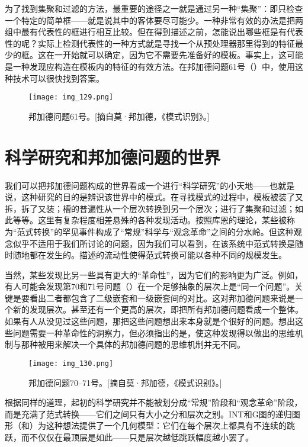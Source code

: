 为了找到集聚和过滤的方法，最重要的途径之一就是通过另一种“集聚”：即只检查一个特定的简单框——就是说其中的客体要尽可能少。一种非常有效的办法是把两组中最有代表性的框进行相互比较。但在得到描述之前，怎能说出哪些框是有代表性的呢？实际上检测代表性的一种方式就是寻找一个从预处理器那里得到的特征最少的框。这在一开始就可以确定，因为它不需要先准备好的模板。事实上，这可能是一种发现应构造在模板内的特征的有效方法。在邦加德问题61号（）中，使用这种技术可以很快找到答案。

\begin{figure}
\texttt{[image: img\_129.png]}
\caption[邦加德问题61号。]
  {邦加德问题61号。[摘自莫·邦加德，《模式识别》。]}
\end{figure}

\section{科学研究和邦加德问题的世界}

我们可以把邦加德问题构成的世界看成一个进行“科学研究”的小天地——也就是说，这种研究的目的是辨识该世界中的模式。在寻找模式的过程中，模板被装了又拆，拆了又装；槽的普遍性从一个层次转换到另一个层次；进行了集聚和过滤；如此等等。这里有复杂程度相差悬殊的各种发现活动。按照库恩的理论，某些被称为“范式转换”的罕见事件构成了“常规”科学与“观念革命”之间的分水岭。但这种观念似乎不适用于我们所讨论的问题，因为我们可以看到，在该系统中范式转换是随时随地都在发生的。描述的流动性使得范式转换可能以各种不同的规模发生。

当然，某些发现比另一些具有更大的“革命性”，因为它们的影响更为广泛。例如，有人可能会发现第70和71号问题（）在一个足够抽象的层次上是“同一个问题”。关键是要看出二者都包含了二级嵌套和一级嵌套间的对比。这对邦加德问题来说是一个新的发现层次。甚至还有一个更高的层次，即把所有邦加德问题看成一个整体。如果有人从没见过这些问题，那把这些问题想出来本身就是个很好的问题。想出这些问题需要一种革命性的洞察力，但必须指出的是，使这种发现得以做出的思维机制与那种被用来解决一个具体的邦加德问题的思维机制并无不同。

\begin{figure}
\texttt{[image: img\_130.png]}
\caption[邦加德问题70--71号。]
  {邦加德问题70--71号。[摘自莫·邦加德，《模式识别》。]}
\end{figure}

根据同样的道理，起初的科学研究并不能被划分成“常规”阶段和“观念革命”阶段，而是充满了范式转换——它们之间只有大小之分和层次之别。INT和G图的递归图形（和）为这种想法提供了一个几何模型：它们在每个层次上都具有不连续的跳跃，而不仅仅在最顶层是如此——只是层次越低跳跃幅度越小罢了。

